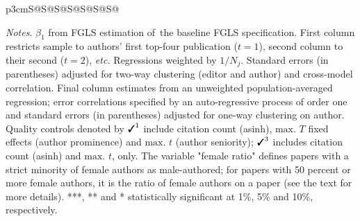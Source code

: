 \begin{table}[H]
\begin{threeparttable}
\begin{tabular}{p{3cm}S@{}S@{}S@{}S@{}S@{}S@{}S@{}}
            \bottomrule
        \end{tabular}
        \begin{tablenotes}
            \tiny
            \item \textit{Notes}. \(\beta_1\) from FGLS estimation of~the baseline FGLS specification. First column restricts sample to authors' first top-four publication (\(t=1\)), second column to their second (\(t=2\)), \textit{etc.} Regressions weighted by \(1/N_j\). Standard errors (in parentheses) adjusted for two-way clustering (editor and author) and cross-model correlation. Final column estimates from an unweighted population-averaged regression; error correlations specified by an auto-regressive process of order one and standard errors (in parentheses) adjusted for one-way clustering on author. Quality controls denoted by \(\text{\ding{51}}^1\) include citation count (asinh), \(\text{max. }T\) fixed effects (author prominence) and \(\text{max. }t\) (author seniority); \(\text{\ding{51}}^3\) includes citation count (asinh) and \(\text{max. }t\), only. The variable "female ratio" defines papers with a strict minority of female authors as male-authored; for papers with 50 percent or more female authors, it is the ratio of female authors on a paper (see the text for more details). ***, ** and * statistically significant at 1\%, 5\% and 10\%, respectively.
        \end{tablenotes}
    \end{threeparttable}
\end{table}